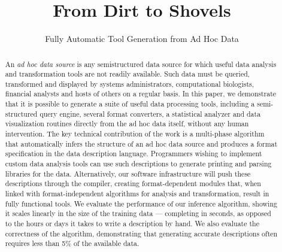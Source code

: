\documentclass[natbib]{sigplanconf}
\begin{document}

\title{From Dirt to Shovels}
\subtitle{Fully Automatic Tool Generation from Ad Hoc Data}

       {}
       {}
       {}


\maketitle{}

\begin{abstract}  
An {\em ad hoc data source} is any semistructured data source for
which useful data analysis and transformation tools are not 
readily available.  Such data must be queried, transformed and displayed by
systems administrators, computational biologists, financial analysts
and hosts of others on a regular basis.  
In this paper, we demonstrate that it is possible to generate a suite
of useful data processing tools, including a semi-structured query
engine, several format converters, a statistical analyzer and data
visualization routines directly from the ad hoc data itself, 
without any human intervention.  
The key technical contribution of the work is a multi-phase algorithm
that automatically infers the structure of an ad hoc data source and
produces a format specification in the \pads{} data description
language.  
Programmers wishing to implement custom data analysis tools
can use such descriptions to generate printing and parsing libraries
for the data.  Alternatively,  our software infrastructure will
push these descriptions through the \pads{} compiler, creating
format-dependent modules that, when linked with format-independent
algorithms for analysis and transformation, result in
fully functional tools.  We evaluate the performance of
our inference algorithm, showing it scales linearly
in the size of the training data --- completing in seconds, as opposed
to the hours or days it takes to write a description by hand.
We also evaluate the correctness of the algorithm, demonstrating that 
generating accurate descriptions often requires less than 5\% of the
available data.
\end{abstract}
\end{document}
